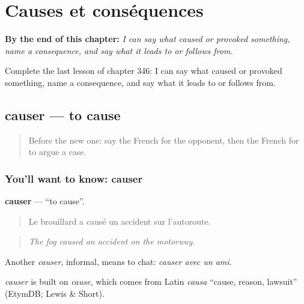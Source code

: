 
\chapter{Causes et conséquences}
\label{ch:fr-causes-et-consequences}

\begin{chapteropening}
\textbf{By the end of this chapter:} \emph{I can say what caused or provoked something, name a consequence, and say what it leads to or follows from.}

Complete the last lesson of chapter 346: I can say what caused or provoked something, name a consequence, and say what it leads to or follows from.
\end{chapteropening}

\section[causer]{causer — to cause}

\label{lesson:FR-C346-causer}



\begin{quote}
Before the new one: say the French for the opponent, then the French for to argue a case.
\end{quote}

\subsection*{You'll want to know: causer}
\textbf{causer} — \textquotedblleft{}to cause\textquotedblright{}.

\begin{quote}
Le brouillard a causé un accident sur l'autoroute.
\end{quote}

\begin{quote}
\emph{The fog caused an accident on the motorway.}
\end{quote}

Another \emph{causer}, informal, means to chat: \emph{causer avec un ami}.

\begin{cousinweb}
\emph{causer} is built on \emph{cause}, which comes from Latin \emph{causa} \textquotedblleft{}cause, reason, lawsuit\textquotedblright{} (EtymDB; Lewis \& Short).
\end{cousinweb}

